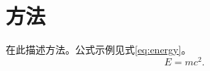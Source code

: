 \section{方法}
\label{sec:method}
在此描述方法。公式示例见式\eqref{eq:energy}。
\begin{equation}
  E = mc^2.
  \label{eq:energy}
\end{equation}
